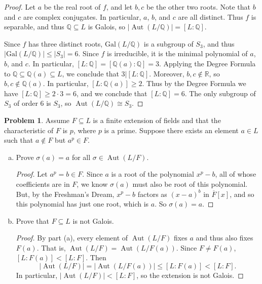 \documentclass[11pt]{article}
\DeclareMathOperator{\Aut}{Aut}
\newcommand{\Q}{\mathbb{Q}}
\newcommand{\R}{\mathbb{R}}
\theoremstyle{definition}
\newtheorem{problem}{Problem}
\begin{document}
\begin{proof}
	Let $a$ be the real root of $f$, and let $b, c$ be the other two roots. Note that $b$ and $c$ are complex conjugates. In particular, $a$, $b$, and $c$ are all distinct. Thus $f$ is separable, and thus $\Q \subseteq L$ is Galois, so $|\Aut(L/\Q)| = [L : \Q]$. 
	
	Since $f$ has three distinct roots, $\mathrm{Gal}(L/\Q)$ is a subgroup of $S_3$, and thus $|\mathrm{Gal}(L/\Q)| \leqslant |S_3| = 6$. Since $f$ is irreducible, it is the minimal polynomial of $a$, $b$, and $c$. In particular, $[L : \Q] = [\Q(a) : \Q] = 3$. Applying the Degree Formula to $\Q \subseteq \Q(a) \subseteq L$, we conclude that $3 | [L : \Q]$. Moreover, $b, c \notin \R$, so $b, c \notin \Q(a)$. In particular, $[L : \Q(a)] \geqslant 2$. Thus by the Degree Formula we have $[L : \Q] \geqslant 2 \cdot 3 = 6$, and we conclude that $[L : \Q] = 6$. The only subgroup of $S_3$ of order $6$ is $S_3$, so $\Aut(L/\Q) \cong S_3$.
\end{proof}

\begin{problem}
Assume $F \subseteq L$ is a finite extension of fields and that the characteristic of $F$ is $p$, where $p$ is a prime. Suppose there exists an element $a \in L$ such that $a \notin F$ but $a^p \in F$.
\begin{enumerate}[(a)]
\item Prove $\sigma(a) = a$ for all $\sigma \in \Aut(L/F)$.

\begin{proof} 
Let $a^p = b \in F$. Since $a$ is a root of the polynomial $x^p - b$, all of whose coefficients are in $F$, we know $\sigma(a)$ must also be root of this polynomial. But, by the Freshman's Dream, $x^p - b$ factors as $(x-a)^b$ in $\overline{F}[x]$, and so this polynomial has just one root, which is $a$. So $\sigma(a) = a$.
\end{proof}

\item Prove that $F \subseteq L$ is not Galois.

\begin{proof} 
By part (a), every element of $\Aut(L/F)$ fixes $a$ and thus also fixes $F(a)$. That is,
    $\Aut(L/F) = \Aut(L/F(a))$. Since $F \neq F(a)$, $[L: F(a)] < [L:F]$. Then
$$| \Aut(L/F) | = |\Aut(L/F(a))| \leqslant [L: F(a)] < [L : F].$$
In particular, $|\Aut(L/F)| < [L:F]$, so the extension is not Galois.
\end{proof}

\end{enumerate}
\end{problem}  
\end{document}
